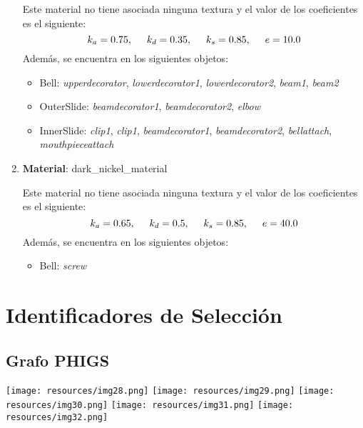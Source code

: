 \documentclass[10pt, a4paper]{article}
\begin{document}
\begin{enumerate}
	Este material no tiene asociada ninguna textura y el valor de los coeficientes es el siguiente:
	\begin{equation*}
		k_a = 0.75, \hspace{0.5cm} k_d = 0.35, \hspace{0.5cm} k_s = 0.85, \hspace{0.5cm} e = 10.0
	\end{equation*}
	Además, se encuentra en los siguientes objetos:
	\begin{itemize}
		\item Bell: \emph{upperdecorator}, \emph{lowerdecorator1}, \emph{lowerdecorator2}, \emph{beam1}, \emph{beam2}
		\item OuterSlide: \emph{beamdecorator1}, \emph{beamdecorator2}, \emph{elbow}
		\item InnerSlide: \emph{clip1}, \emph{clip1}, \emph{beamdecorator1}, \emph{beamdecorator2}, \emph{bellattach}, \emph{mouthpieceattach}
	\end{itemize}
	\item \textbf{Material}: dark\_nickel\_material
	
	Este material no tiene asociada ninguna textura y el valor de los coeficientes es el siguiente:
	\begin{equation*}
		k_a = 0.65, \hspace{0.5cm} k_d = 0.5, \hspace{0.5cm} k_s = 0.85, \hspace{0.5cm} e = 40.0
	\end{equation*}
	Además, se encuentra en los siguientes objetos:
	\begin{itemize}
		\item Bell: \emph{screw}
	\end{itemize}
\end{enumerate}

\section{Identificadores de Selección}

\subsection{Grafo PHIGS}

\begin{center}
	\texttt{[image: resources/img28.png]}
	\newpage
	\texttt{[image: resources/img29.png]}
	\newpage
	\texttt{[image: resources/img30.png]}
	\newpage
	\texttt{[image: resources/img31.png]}
	\newpage
	\texttt{[image: resources/img32.png]}
\end{center}
\end{document}
